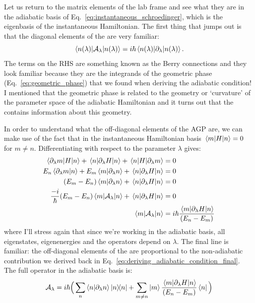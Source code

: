     Let us return to the matrix elements of the lab frame  and see what they are in the adiabatic basis of Eq.~\eqref{eq:instantaneous_schroedinger}, which is the eigenbasis of the instantaneous Hamiltonian. The first thing that jumps out is that the diagonal elements of the  are very familiar:
    \begin{equation}\label{eq:AGP_diagonal}
        \mel{n(\lambda)}{\mathcal{A}_{\lambda}}{n(\lambda)} = i\hbar \mel{n(\lambda)}{\partial_{\lambda}}{n(\lambda)}.
    \end{equation}
    The terms on the RHS are something known as the Berry connections and they look familiar because they are the integrands of the geometric phase (Eq.~\eqref{eq:geometric_phase}) that we found when deriving the adiabatic condition! I mentioned that the geometric phase is related to the geometry or `curvature' of the parameter space of the adiabatic Hamiltonian and it turns out that the  contains information about this geometry. 

    In order to understand what the off-diagonal elements of the AGP are, we can make use of the fact that in the instantaneous Hamiltonian basis $\mel{m}{H}{n} = 0$ for $m \neq n$. Differentiating with respect to the parameter $\lambda$ gives:
    \begin{equation}\label{eq:differentiating_adiabatic_offdiagonals}
       \begin{aligned}
           \mel{\partial_{\lambda}m}{H}{n} + \mel{n}{\partial_{\lambda}H}{n} + \mel{n}{H}{\partial_{\lambda}m} &= 0 \\
           E_n \braket{\partial_{\lambda} m}{n} + E_m \braket{m}{\partial_{\lambda} n} + \mel{n}{\partial_{\lambda}H}{n} &= 0 \\
           (E_m - E_n) \braket{m}{\partial_{\lambda} n} + \mel{n}{\partial_{\lambda}H}{n} &= 0 \\
           \frac{-i}{\hbar} (E_m - E_n) \mel{m}{\mathcal{A}_{\lambda}}{n} + \mel{n}{\partial_{\lambda}H}{n} &= 0 \\
           \mel{m}{\mathcal{A}_{\lambda}}{n} &= i\hbar \frac{\mel{m}{\partial_{\lambda}H}{n}}{(E_n - E_m)}
       \end{aligned} 
    \end{equation}
    where I'll stress again that since we're working in the adiabatic basis, all eigenstates, eigenenergies and the operators depend on $\lambda$. The final line is familiar: the off-diagonal elements of the  are proportional to the non-adiabatic contribution we derived back in Eq.~\eqref{eq:deriving_adiabatic_condition_final}. The full operator in the adiabatic basis is:
    \begin{equation}\label{eq:AGP_adiabatic_basis}
        \AGP{\lambda} = i\hbar\Big(\sum_n \braket{n}{\dlambda n} \dyad{n} + \sum_{m \neq n} \ket{m} \frac{\mel{m}{\dlambda H}{n}}{(E_n - E_m)} \bra{n} \Big)
    \end{equation}

